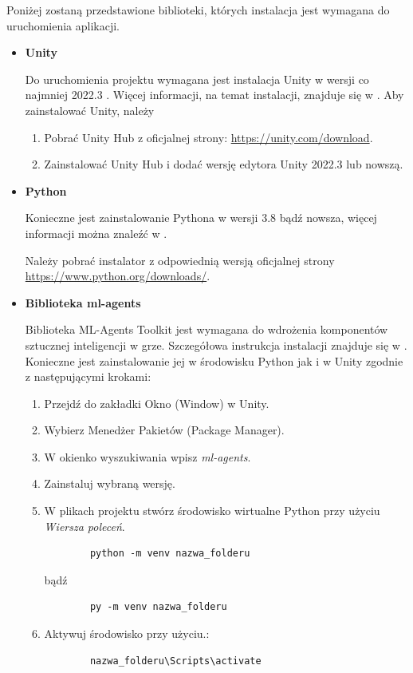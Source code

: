 \documentclass[a4paper,twoside,12pt]{book}
\begin{document}
		Poniżej zostaną przedstawione biblioteki, których instalacja jest wymagana do uruchomienia aplikacji.
	\begin{itemize}
		\item \textbf{Unity}
	
	Do uruchomienia projektu wymagana jest instalacja Unity w wersji co najmniej 2022.3 . Więcej informacji, na temat instalacji, znajduje się w \cite{bib:Unity_instalacja}. Aby zainstalować Unity, należy
	\begin{enumerate}
		\item Pobrać Unity Hub z oficjalnej strony: \url{https://unity.com/download}.
		\item Zainstalować Unity Hub i dodać wersję edytora Unity 2022.3 lub nowszą.
	\end{enumerate}
	
	\item \textbf{Python}
	
	Konieczne jest zainstalowanie Pythona w wersji 3.8 bądź nowsza, więcej informacji można znaleźć w \cite{bib:link_do_instrukcji_python}.
	
	Należy pobrać instalator z odpowiednią wersją oficjalnej strony 
		\url{https://www.python.org/downloads/}.
	
	\item \textbf{Biblioteka ml-agents}
	
	Biblioteka ML-Agents Toolkit jest wymagana do wdrożenia komponentów sztucznej inteligencji w grze. Szczegółowa instrukcja instalacji znajduje się w \cite{bib:link_do_instrukcji_ml-agents}. Konieczne jest zainstalowanie jej w środowisku Python jak i w Unity zgodnie z następującymi krokami:
	\begin{enumerate}
	\item Przejdź do zakładki Okno (Window) w Unity.
	\item Wybierz Menedżer Pakietów (Package Manager).
	\item W okienko wyszukiwania wpisz \textit{ml-agents}.
	\item Zainstaluj wybraną wersję.
	\item W plikach projektu stwórz środowisko wirtualne Python przy użyciu \textit{Wiersza poleceń}.
	\begin{verbatim}
		python -m venv nazwa_folderu
	\end{verbatim}
	bądź 
	\begin{verbatim}
		py -m venv nazwa_folderu
	\end{verbatim}
	
	\item Aktywuj środowisko przy użyciu.:
	\begin{verbatim}
		nazwa_folderu\Scripts\activate
	\end{verbatim}
	

\end{enumerate}
\end{itemize}
\end{document}
